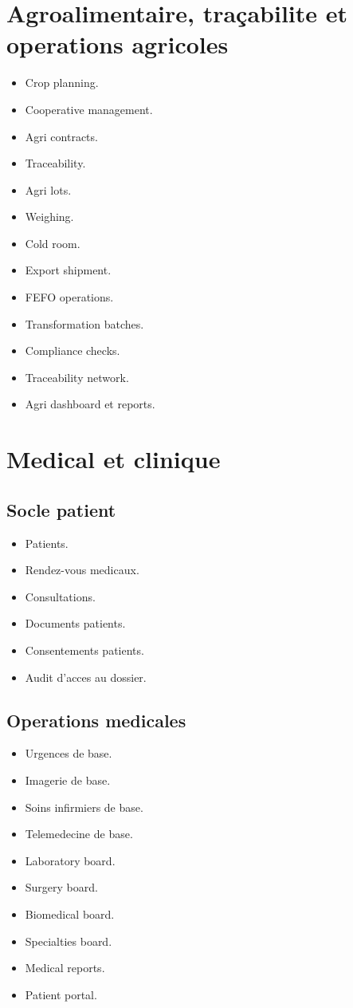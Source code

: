 \documentclass[11pt,a4paper]{article}
\begin{document}
\section{Agroalimentaire, traçabilite et operations agricoles}
\begin{itemize}[leftmargin=1.2cm]
    \item Crop planning.
    \item Cooperative management.
    \item Agri contracts.
    \item Traceability.
    \item Agri lots.
    \item Weighing.
    \item Cold room.
    \item Export shipment.
    \item FEFO operations.
    \item Transformation batches.
    \item Compliance checks.
    \item Traceability network.
    \item Agri dashboard et reports.
\end{itemize}

\section{Medical et clinique}
\subsection{Socle patient}
\begin{itemize}[leftmargin=1.2cm]
    \item Patients.
    \item Rendez-vous medicaux.
    \item Consultations.
    \item Documents patients.
    \item Consentements patients.
    \item Audit d'acces au dossier.
\end{itemize}

\subsection{Operations medicales}
\begin{itemize}[leftmargin=1.2cm]
    \item Urgences de base.
    \item Imagerie de base.
    \item Soins infirmiers de base.
    \item Telemedecine de base.
    \item Laboratory board.
    \item Surgery board.
    \item Biomedical board.
    \item Specialties board.
    \item Medical reports.
    \item Patient portal.
\end{itemize}
\end{document}
